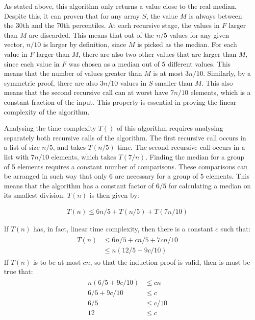 As stated above, this algorithm only returns a value close to the real median. Despite this, it can proven that for any array $S$, the value $M$ is always between the 30th and the 70th percentiles. At each recursive stage, the values in $F$ larger than $M$ are discarded. This means that out of the $n/5$ values for any given vector, $n/10$ is larger by definition, since $M$ is picked as the median. For each value in $F$ larger than $M$, there are also two other values that are larger than $M$, since each value in $F$ was chosen as a median out of 5 different values. This means that the number of values greater than $M$ is at most $3n/10$. Similarly, by a symmetric proof, there are also $3n/10$ values in $S$ smaller than $M$. This also means that the second recursive call can at worst have $7n/10$ elements, which is a constant fraction of the input. This property is essential in proving the linear complexity of the algorithm.

Analysing the time complexity $T()$ of this algorithm requires analysing separately both recursive calls of the algorithm. The first recursive call occurs in a list of size $n/5$, and takes $T(n/5)$ time. The second recursive call occurs in a list with $7n/10$ elements, which takes $T(7/n)$. Finding the median for a group of 5 elements requires a constant number of comparisons. These comparisons can be arranged in such way that only 6 are necessary for a group of 5 elements. This means that the algorithm has a constant factor of $6/5$ for calculating a median on its smallest division. $T(n)$ is then given by:

\begin{align}
T(n) \le 6n/5 + T(n/5) + T(7n/10)
\end{align}

If $T(n)$ has, in fact, linear time complexity, then there is a constant $c$ such that:
\begin{align}
\begin{aligned}
T(n) & \le 6n/5 + cn/5 + 7cn/10\\
     & \le n(12/5 + 9c/10)
\end{aligned}
\end{align}
If $T(n)$ is to be at most $cn$, so that the induction proof is valid, then is must be true that:
\begin{align}
\begin{aligned}
    n (6/5 + 9c/10) & \le cn \\
        6/5 + 9c/10 & \le c \\
                6/5 & \le c/10 \\
                 12 & \le c \\
\end{aligned}
\end{align}

